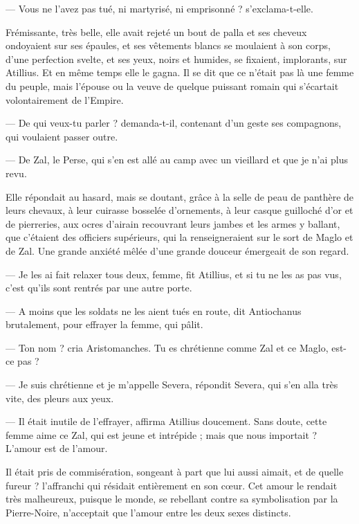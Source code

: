 \documentclass[a4paper, 11pt, oneside, polutonikogreek, french]{article}
\begin{document}
--- Vous ne l'avez pas tué, ni martyrisé, ni emprisonné ? s'exclama-t-elle.

Frémissante, très belle, elle avait rejeté un bout de palla et ses cheveux ondoyaient sur ses épaules, et ses vêtements blancs se moulaient à son corps, d'une perfection svelte, et ses yeux, noirs et humides, se fixaient, implorants, sur Atillius. Et en même temps elle le gagna. Il se dit que ce n'était pas là une femme du peuple, mais l'épouse ou la veuve de quelque puissant romain qui s'écartait volontairement de l'Empire.

--- De qui veux-tu parler ? demanda-t-il, contenant d'un geste ses compagnons, qui voulaient passer outre.

--- De Zal, le Perse, qui s'en est allé au camp avec un vieillard et que je n'ai plus revu.

Elle répondait au hasard, mais se doutant, grâce à la selle de peau de panthère de leurs chevaux, à leur cuirasse bosselée d'ornements, à leur casque guilloché d'or et de pierreries, aux ocres d'airain recouvrant leurs jambes et les armes y ballant, que c'étaient des officiers supérieurs, qui la renseigneraient sur le sort de Maglo et de Zal. Une grande anxiété mêlée d'une grande douceur émergeait de son regard.

--- Je les ai fait relaxer tous deux, femme, fit Atillius, et si tu ne les as pas vus, c'est qu'ils sont rentrés par une autre porte.

--- A moins que les soldats ne les aient tués en route, dit Antiochanus brutalement, pour effrayer la femme, qui pâlit.

--- Ton nom ? cria Aristomanches. Tu es chrétienne comme Zal et ce Maglo, est-ce pas ?

--- Je suis chrétienne et je m'appelle Severa, répondit Severa, qui s'en alla très vite, des pleurs aux yeux.

--- Il était inutile de l'effrayer, affirma Atillius doucement. Sans doute, cette femme aime ce Zal, qui est jeune et intrépide ; mais que nous importait ? L'amour est de l'amour.

Il était pris de commisération, songeant à part que lui aussi aimait, et de quelle fureur ? l'affranchi qui résidait entièrement en son cœur. Cet amour le rendait très malheureux, puisque le monde, se rebellant contre sa symbolisation par la Pierre-Noire, n'acceptait que l'amour entre les deux sexes distincts.
\end{document}
